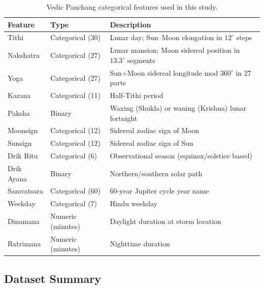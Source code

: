 \documentclass[12pt,a4paper]{article}
\begin{document}
\begin{table}[H]
  \centering
  \caption{Vedic Panchang categorical features used in this study.}
  \label{tab:panchang_features}
  \small
  \begin{tabular}{llp{7.5cm}}
    \toprule
    \textbf{Feature} & \textbf{Type} & \textbf{Description} \\
    \midrule
    Tithi       & Categorical (30)  & Lunar day; Sun--Moon elongation in $12^\circ$ steps \\
    Nakshatra   & Categorical (27)  & Lunar mansion; Moon sidereal position in $13.3^\circ$ segments \\
    Yoga        & Categorical (27)  & Sun+Moon sidereal longitude mod $360^\circ$ in 27 parts \\
    Karana      & Categorical (11)  & Half-Tithi period \\
    Paksha      & Binary            & Waxing (Shukla) or waning (Krishna) lunar fortnight \\
    Moonsign    & Categorical (12)  & Sidereal zodiac sign of Moon \\
    Sunsign     & Categorical (12)  & Sidereal zodiac sign of Sun \\
    Drik Ritu   & Categorical (6)   & Observational season (equinox/solstice based) \\
    Drik Ayana  & Binary            & Northern/southern solar path \\
    Samvatsara  & Categorical (60)  & 60-year Jupiter cycle year name \\
    Weekday     & Categorical (7)   & Hindu weekday \\
    Dinamana    & Numeric (minutes) & Daylight duration at storm location \\
    Ratrimana   & Numeric (minutes) & Nighttime duration \\
    \bottomrule
  \end{tabular}
\end{table}

\subsection{Dataset Summary}
\end{document}
